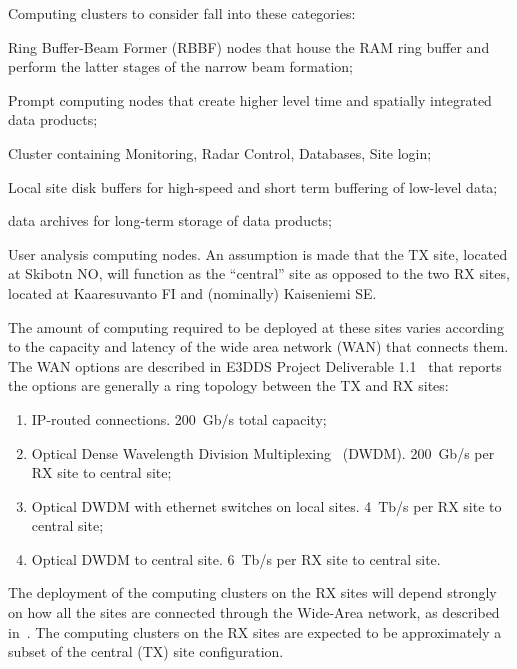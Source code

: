 \documentclass[12pt,a4paper]{article}
\begin{document}
Computing clusters to consider fall into these categories:
\bitm
\item Ring Buffer-Beam Former (RBBF) nodes that house the RAM ring buffer and perform the latter stages of the narrow beam formation;
\item Prompt computing nodes that create higher level time and spatially integrated data products;
\item Cluster containing Monitoring, Radar Control, Databases, Site login;
\item Local site disk buffers for high-speed and short term buffering of low-level data;
\item \ED data archives for long-term storage of data products;
\item User analysis computing nodes.
\eitm
An assumption is made that the TX site, located at Skibotn NO, will function as the ``central'' site as opposed to the two RX sites, located at Kaaresuvanto FI and (nominally) Kaiseniemi SE. %

The amount of computing required to be deployed at these sites varies according to the capacity and latency of the wide area network (WAN) that connects them.  
The WAN options are described in E3DDS Project Deliverable 1.1~\cite{e3dds-del-1-1} that reports 
the options are generally a ring topology between the TX and RX sites:
\begin{enumerate}
\item IP-routed connections. 200~Gb/s total capacity;
\item Optical Dense Wavelength Division Multiplexing~\cite{dwdm} (DWDM). 200~Gb/s per RX site to central site;
\item Optical DWDM with ethernet switches on local sites. 4~Tb/s per RX site to central site;
\item Optical DWDM to central site. 6~Tb/s per RX site to central site.
\end{enumerate}


The deployment of the computing clusters on the RX sites will depend strongly on how all the sites are connected through the Wide-Area network, as described in~\cite{e3dds-del-1-1}.
The computing clusters on the RX sites are expected to be  approximately a subset of the central (TX) site configuration.
\end{document}
